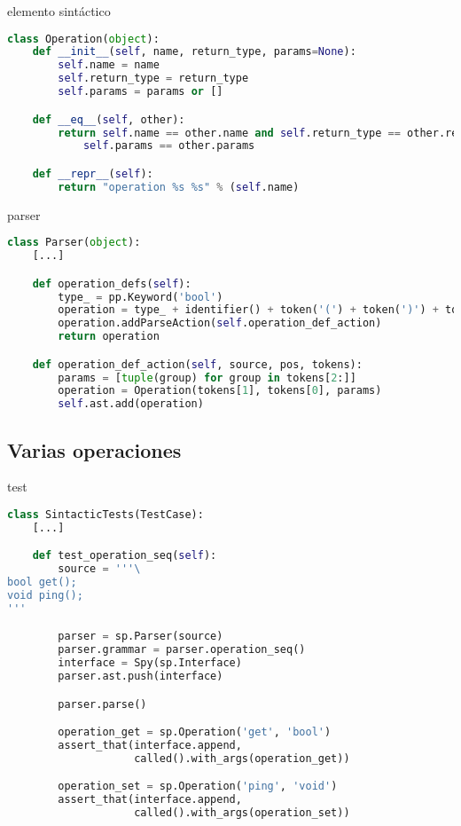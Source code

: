 \documentclass[11pt]{beamer}
\begin{document}
\begin{frame}[fragile]{elemento sintáctico}
\begin{lstlisting}[language=Python]
class Operation(object):
    def __init__(self, name, return_type, params=None):
        self.name = name
        self.return_type = return_type
        self.params = params or []

    def __eq__(self, other):
        return self.name == other.name and self.return_type == other.return_type and \
            self.params == other.params

    def __repr__(self):
        return "operation %s %s" % (self.name)
\end{lstlisting}
\end{frame}


\begin{frame}[fragile]{parser}
\begin{lstlisting}[language=Python]
class Parser(object):
    [...]

    def operation_defs(self):
        type_ = pp.Keyword('bool')
        operation = type_ + identifier() + token('(') + token(')') + token(';')
        operation.addParseAction(self.operation_def_action)
        return operation

    def operation_def_action(self, source, pos, tokens):
        params = [tuple(group) for group in tokens[2:]]
        operation = Operation(tokens[1], tokens[0], params)
        self.ast.add(operation)
\end{lstlisting}
\end{frame}


\subsection{Varias operaciones}

\begin{frame}[fragile]{test}
\begin{lstlisting}[language=Python]
class SintacticTests(TestCase):
    [...]

    def test_operation_seq(self):
        source = '''\
bool get();
void ping();
'''

        parser = sp.Parser(source)
        parser.grammar = parser.operation_seq()
        interface = Spy(sp.Interface)
        parser.ast.push(interface)

        parser.parse()

        operation_get = sp.Operation('get', 'bool')
        assert_that(interface.append,
                    called().with_args(operation_get))

        operation_set = sp.Operation('ping', 'void')
        assert_that(interface.append,
                    called().with_args(operation_set))
\end{lstlisting}
\end{frame}
\end{document}
